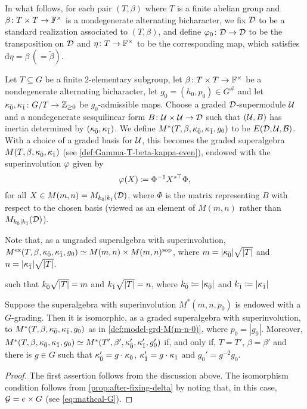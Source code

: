 In what follows, for each pair $(T, \beta)$ where $T$ is a finite abelian group and $\beta\colon {T\times T} \to \mathbb{F}^\times$ is a nondegenerate alternating bicharacter, we fix $\mathcal{D}$ to be a standard realization associated to $(T, \beta)$, and define $\varphi_0\colon \mathcal{D} \to \mathcal{D}$ to be the transposition on $\mathcal{D}$ and $\eta\colon T \to \mathbb{F}^\times$ to be the corresponding map, which satisfies $\mathrm{d}\eta = \beta \, (= \tilde\beta)$. 

\begin{defi}\label{def:model-grd-M(m-n-0)}
    Let $T \subseteq G$ be a finite $2$-elementary subgroup, let $\beta\colon {T\times T} \to \mathbb{F}^\times$ be a nondegenerate alternating bicharacter, let $g_0 = (h_0, p_0) \in G^\#$ and let $\kappa_{\bar{0}}, \kappa_{\bar{1}} \colon G/T \to \mathbb{Z}_{\geq 0}$ be $g_0$-admissible maps. 
    Choose a graded $\mathcal{D}$-supermodule $\mathcal U$ and a nondegenerate sesquilinear form $B\colon \mathcal U\times \mathcal U \to \mathcal{D}$ such that $(\mathcal U, B)$ has inertia determined by $(\kappa_{\bar{0}}, \kappa_{\bar{1}})$. 
    We define $M^*(T, \beta, \kappa_{\bar{0}}, \kappa_{\bar{1}}, g_0)$ to be $E(\mathcal{D}, \mathcal U, \mathcal B)$. 
    With a choice of a graded basis for $\mathcal U$, this becomes
    the graded superalgebra $M (T, \beta, \kappa_{\bar{0}}, \kappa_{\bar{1}})$ (see \cref{def:Gamma-T-beta-kappa-even}), endowed with the superinvolution $\varphi$ given by 
    \[
        \varphi(X) \coloneqq \Phi^{-1} X^{s\top} \Phi,
    \]
    for all $X \in M(m,n)= M_{k_{\bar{0}} \mid k_{\bar{1}}}(\mathcal{D})$, where $\Phi$ is the matrix representing $B$ with respect to the chosen basis (viewed as an element of $M(m,n)$ rather than $M_{k_{\bar{0}} | k_{\bar{1}}} (\mathcal{D})$). 
\end{defi}

Note that, as a ungraded superalgebra with superinvolution, $M^{\mathrm{ex}}(T, \beta, \kappa_{\bar{0}}, \kappa_{\bar{1}}, g_0) \simeq M(m,n)\times M(m,n)^{\mathrm{sop}}$, where $m = |\kappa_{\bar{0}}| \sqrt{|T|}$ and $n = |\kappa_{\bar{1}}| \sqrt{|T|}$.

 such that $k_{\bar{0}} \sqrt{|T|} = m$ and $k_{\bar{1}} \sqrt{|T|} = n$, where $k_{\bar{0}} \coloneqq |\kappa_{\bar{0}}|$ and $k_{\bar{1}} \coloneqq |\kappa_{\bar{1}}|$

\begin{thm}\label{thm:osp-and-p-associative}
    Suppose the superalgebra with superinvolution $M^*(m,n,p_0)$ is endowed with a $G$-grading. 
    Then it is isomorphic, as a graded superalgebra with superinvolution, to $M^*(T,\beta, \kappa_{\bar{0}}, \kappa_{\bar{1}}, g_0)$ as in \cref{def:model-grd-M(m-n-0)}, where $p_0 = |g_0|$. 
    Moreover, $M^*(T, \beta, \kappa_{\bar{0}}, \kappa_{\bar{1}}, g_0) \simeq M^*(T', \beta', \kappa_{\bar{0}}', \kappa_{\bar{1}}', g_0')$ if, and only if, $T =T'$, $\beta = \beta'$ and there is $g \in G$ such that $\kappa_{\bar{0}}' = g\cdot\kappa_{\bar{0}}$, $\kappa_{\bar{1}}' = g\cdot\kappa_{\bar{1}}$ and $g_0' = g^{-2}g_0$. 
\end{thm}

\begin{proof}
    The first assertion follows from the discussion above. 
    The isomorphism condition follows from \cref{prop:after-fixing-delta} by noting that, in this case, $\mathcal G = {e} \times G$ (see \cref{eq:mathcal-G}). 
\end{proof}